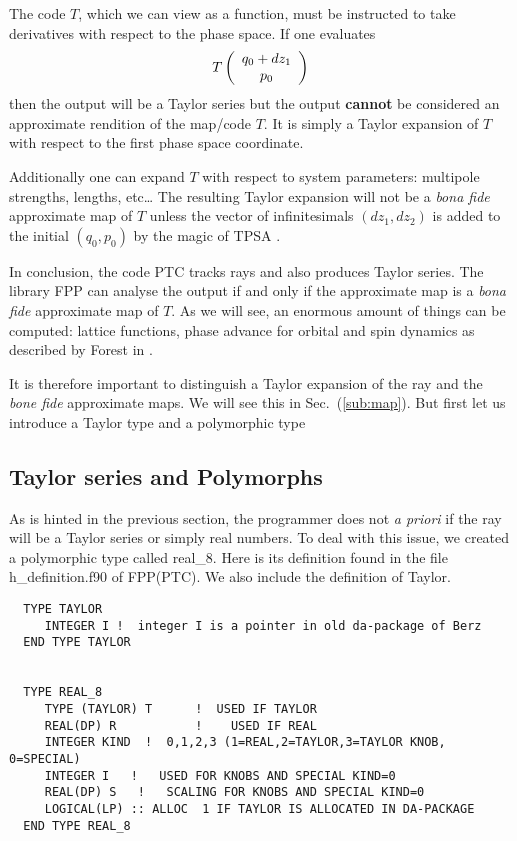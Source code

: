 \documentclass[english,12pt,article]{article} %
\def\sec#1{\rm Sec.~(\ref{#1})}
\begin{document}
 The code $T$, which we can view  as a function,  must be instructed to take derivatives with respect to the phase space. If one evaluates 
%
%
\begin{align} T\left({\begin{array}{c} {q}_{0}+d{z}_{1} \cr {p}_{0}\end{array}}\right) \nonumber 
\end{align}
%
then the output will be a Taylor series but the output {\bf cannot}  be considered an approximate rendition of the map/code $T$. It is simply a Taylor expansion of $T$ with respect to the first phase space coordinate.  

Additionally one can expand $T$ with respect to system parameters: multipole strengths, lengths, etc\ldots 
The resulting Taylor expansion will not be a {\it bona fide} approximate map of $T$ unless the vector of infinitesimals $(dz_1,dz_2)$ is added to the initial $(q_0,p_0)$ by the magic of TPSA .

In conclusion, the code PTC tracks rays and also produces Taylor series. The library FPP can analyse the output if and only if the approximate map is a {\it bona fide} approximate map of $T$.  As we will see, an enormous amount of things can be computed: lattice functions, phase advance for orbital and spin dynamics as described by Forest 
in  \cite{thebook2}.

It is therefore important to distinguish a Taylor expansion of the ray and the {\it bone fide} approximate maps.  We will see this in \sec{sub:map}. But first let us introduce a Taylor type and a polymorphic type

 \subsection{Taylor series and Polymorphs}\label{sub:pol}

As is hinted in the previous section, the programmer does not {\it a priori} if the ray will be a Taylor series or simply real numbers. To deal with this issue, we created a polymorphic type called real\_8. Here is its definition found in the file h\_definition.f90 of FPP(PTC). We also include the definition of Taylor.

{\footnotesize
\begin{verbatim}
  TYPE TAYLOR
     INTEGER I !  integer I is a pointer in old da-package of Berz
  END TYPE TAYLOR


  TYPE REAL_8
     TYPE (TAYLOR) T      !  USED IF TAYLOR
     REAL(DP) R           !    USED IF REAL
     INTEGER KIND  !  0,1,2,3 (1=REAL,2=TAYLOR,3=TAYLOR KNOB, 0=SPECIAL)
     INTEGER I   !   USED FOR KNOBS AND SPECIAL KIND=0
     REAL(DP) S   !   SCALING FOR KNOBS AND SPECIAL KIND=0
     LOGICAL(LP) :: ALLOC  1 IF TAYLOR IS ALLOCATED IN DA-PACKAGE
  END TYPE REAL_8
\end{verbatim}
}
\end{document}
